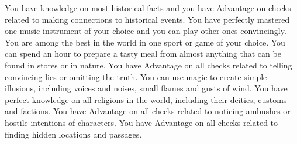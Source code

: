{
	You have knowledge on most historical facts and you have Advantage on checks related to making connections to historical events. 	 
}
\vfill
{}
{
	You have perfectly mastered one music instrument of your choice and you can play other ones convincingly.
}
\vfill
{}
{
	You are among the best in the world in one sport or game of your choice.
}
\vfill
{}
{
	You can spend an hour to prepare a tasty meal from almost anything that can be found in stores or in nature.
}
\vfill
{}
{
	You have Advantage on all checks related to telling convincing lies or omitting the truth.
}
\vfill
{}
{
	You can use magic to create simple illusions, including voices and noises, small flames and gusts of wind.
}
\vfill
{}
{
	You have perfect knowledge on all religions in the world, including their deities, customs and factions.
}
\vfill
{}
{
	You have Advantage on all checks related to noticing ambushes or hostile intentions of characters.
}
\vfill
{}
{
	You have Advantage on all checks related to finding hidden locations and passages. 	 
}
\clearpage